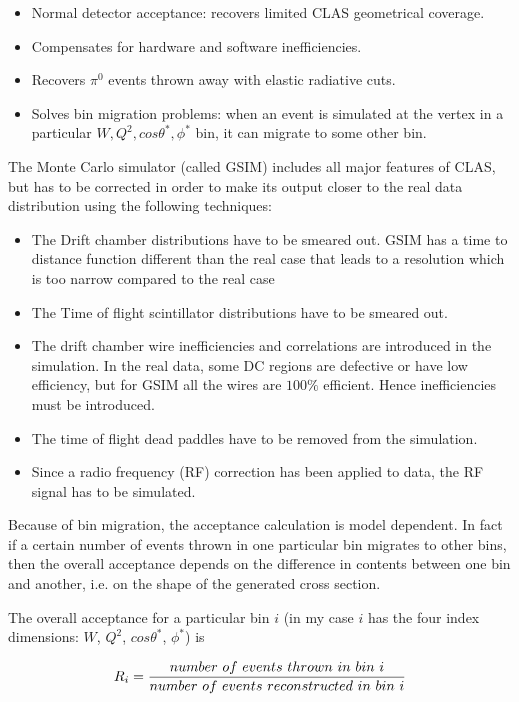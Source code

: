 \begin{itemize}
\item Normal detector acceptance: recovers limited CLAS geometrical coverage.
\item Compensates for hardware and software inefficiencies.
\item Recovers $\pi^0$ events thrown away with elastic radiative cuts. 
\item Solves bin migration problems: when an event is simulated at the vertex in a particular $W, Q^2, cos\theta^*, \phi^*$ bin,
       it can migrate to some other bin.
\end{itemize}
The Monte Carlo simulator (called GSIM) includes all major features of CLAS, but has to be corrected in order 
to make its output closer to the real data distribution using the following techniques:
\begin{itemize}
\item The Drift chamber distributions have to be smeared out. GSIM has a time to distance function
      different than the real case that leads to a resolution which is too narrow compared to the real case 
\item The Time of flight scintillator distributions have to be smeared out.
\item The drift chamber wire inefficiencies and correlations are introduced in the simulation.
      In the real data, some DC regions are defective or have low efficiency, but for GSIM all the wires
      are $100\%$ efficient. Hence inefficiencies must be introduced.
\item The time of flight dead paddles have to be removed from the simulation.
\item Since a radio frequency (RF) correction has been applied to data, the RF signal has to be simulated.
\end{itemize}
Because of bin migration, the acceptance calculation is model dependent. In fact if a certain number 
of events thrown
in one particular bin migrates to other bins, then the overall acceptance depends on the difference
in contents between one bin and another, i.e.  on the shape of the generated cross section.

The overall acceptance for a particular bin $i$ (in my case $i$ has the four index dimensions: $W$, $Q^2$,
$cos\theta^*$, $\phi^*$) is

$$ 
R_i = \frac{\displaystyle number \,\, of\,\, events\,\, thrown\,\, in\,\, bin\,\, i}{\displaystyle number\,\, of\,\, events \,\, reconstructed\,\, in\,\, bin\,\, i}
$$


